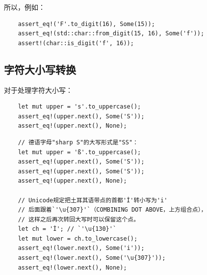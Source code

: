 



所以，例如：

\begin{verbatim}
    assert_eq!('F'.to_digit(16), Some(15));
    assert_eq!(std::char::from_digit(15, 16), Some('f'));
    assert!(char::is_digit('f', 16));
\end{verbatim}

\subsection{字符大小写转换}\label{CaseConv}

对于处理字符大小写：


\begin{verbatim}
    let mut upper = 's'.to_uppercase();
    assert_eq!(upper.next(), Some('S'));
    assert_eq!(upper.next(), None);
\end{verbatim}

\begin{verbatim}
    // 德语字母"sharp S"的大写形式是"SS"：
    let mut upper = 'ß'.to_uppercase();
    assert_eq!(upper.next(), Some('S'));
    assert_eq!(upper.next(), Some('S'));
    assert_eq!(upper.next(), None);

    // Unicode规定把土耳其语带点的首都'İ'转小写为'i'
    // 后面跟着`'\u{307}'`（COMBINING DOT ABOVE，上方组合点），
    // 这样之后再次转回大写时可以保留这个点。
    let ch = 'İ'; // `'\u{130}'`
    let mut lower = ch.to_lowercase();
    assert_eq!(lower.next(), Some('i'));
    assert_eq!(lower.next(), Some('\u{307}'));
    assert_eq!(lower.next(), None);
\end{verbatim}

